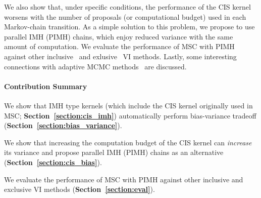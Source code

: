 We also show that, under specific conditions, the performance of the CIS kernel worsens with the number of proposals (or computational budget) used in each Markov-chain transition.
As a simple solution to this problem, we propose to use parallel IMH (PIMH) chains, which enjoy reduced variance with the same amount of computation.
We evaluate the performance of MSC with PIMH against other inclusive~\cite{DBLP:journals/corr/BornscheinB14, NEURIPS2020_b2070693} and exlusive~\cite{pmlr-v33-ranganath14, JMLR:v18:16-107} VI methods.
Lastly, some interesting connections with adaptive MCMC methods~\citep{10.1007/s11222-008-9110-y} are discussed.

\paragraph{Contribution Summary}
\begin{enumerate*}[label=\textbf{(\roman*)}]
\item We show that IMH type kernels (which include the CIS kernel originally used in MSC; \textbf{Section~\ref{section:cis_imh}}) automatically perform bias-variance tradeoff (\textbf{Section~\ref{section:bias_variance}}).
\item We show that increasing the computation budget of the CIS kernel can \textit{increase} its variance and propose parallel IMH (PIMH) chains as an alternative (\textbf{Section~\ref{section:cis_bias}}).
\item We evaluate the performance of MSC with PIMH against other inclusive and exclusive VI methods (\textbf{Section~\ref{section:eval}}).
\end{enumerate*}





